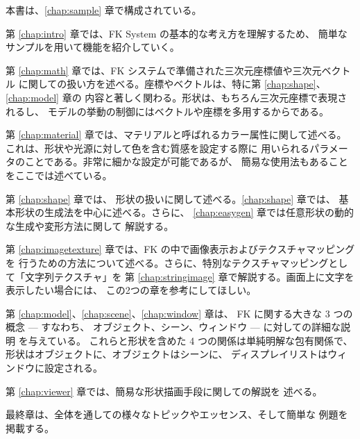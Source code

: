 本書は、\ref{chap:sample} 章で構成されている。

第 \ref{chap:intro} 章では、FK System の基本的な考え方を理解するため、
簡単なサンプルを用いて機能を紹介していく。

第 \ref{chap:math} 章では、FK システムで準備された三次元座標値や三次元ベクトル
に関しての扱い方を述べる。座標やベクトルは、特に第 \ref{chap:shape}、
\ref{chap:model} 章の
内容と著しく関わる。形状は、もちろん三次元座標で表現されるし、
モデルの挙動の制御にはベクトルや座標を多用するからである。

第 \ref{chap:material} 章では、マテリアルと呼ばれるカラー属性に関して述べる。
これは、形状や光源に対して色を含む質感を設定する際に
用いられるパラメータのことである。非常に細かな設定が可能であるが、
簡易な使用法もあることをここでは述べている。

第 \ref{chap:shape} 章では、
形状の扱いに関して述べる。\ref{chap:shape} 章では、
基本形状の生成法を中心に述べる。さらに、
\ref{chap:easygen} 章では任意形状の動的な生成や変形方法に関して
解説する。


第 \ref{chap:imagetexture} 章では、FK の中で画像表示およびテクスチャマッピングを
行うための方法について述べる。さらに、特別なテクスチャマッピングとして「文字列テクスチャ」を
第 \ref{chap:stringimage} 章で解説する。画面上に文字を表示したい場合には、
この2つの章を参考にしてほしい。

第 \ref{chap:model}、\ref{chap:scene}、\ref{chap:window} 章は、
FK に関する大きな 3 つの概念 --- すなわち、
オブジェクト、シーン、ウィンドウ --- に対しての詳細な説明
を与えている。
これらと形状を含めた 4 つの関係は単純明解な包有関係で、
形状はオブジェクトに、オブジェクトはシーンに、
ディスプレイリストはウィンドウに設定される。

第 \ref{chap:viewer} 章では、簡易な形状描画手段に関しての解説を
述べる。

最終章は、全体を通しての様々なトピックやエッセンス、そして簡単な
例題を掲載する。
